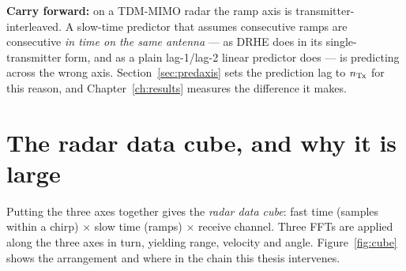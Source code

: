 \begin{keybox}
\textbf{Carry forward:} on a TDM-MIMO radar the ramp axis is
transmitter-interleaved. A slow-time predictor that assumes consecutive ramps
are consecutive \emph{in time on the same antenna} --- as DRHE does in its
single-transmitter form, and as a plain lag-1/lag-2 linear predictor does ---
is predicting across the wrong axis. Section~\ref{sec:predaxis} sets the
prediction lag to $n_{\mathrm{Tx}}$ for this reason, and Chapter~\ref{ch:results}
measures the difference it makes.
\end{keybox}

\section{The radar data cube, and why it is large}
\label{sec:cube}

Putting the three axes together gives the \emph{radar data cube}: fast time
(samples within a chirp) $\times$ slow time (ramps) $\times$ receive channel.
Three FFTs are applied along the three axes in turn, yielding range, velocity
and angle. Figure~\ref{fig:cube} shows the arrangement and where in the chain
this thesis intervenes.

